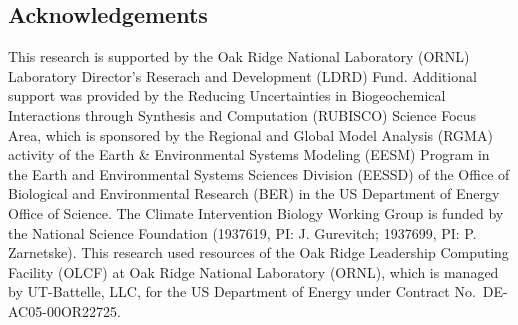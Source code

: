 \documentclass[landscape,custom]{sciposter}
\begin{document}
\begin{multicols}{3}
\section*{\large Acknowledgements}


\vspace*{-0.15in}
\vbox{%
This research is supported by the Oak Ridge National Laboratory (ORNL)
Laboratory Director's Reserach and Development (LDRD) Fund.
Additional support was provided by the Reducing Uncertainties in
Biogeochemical Interactions through Synthesis and Computation (RUBISCO)
Science Focus Area, which is sponsored by the Regional and Global Model
Analysis (RGMA) activity of the Earth \& Environmental Systems Modeling
(EESM) Program in the Earth and Environmental Systems Sciences Division
(EESSD) of the Office of Biological and Environmental Research (BER)
in the US Department of Energy Office of Science.
%
The Climate Intervention Biology Working Group is funded by the National
Science Foundation (1937619, PI: J. Gurevitch; 1937699, PI: P. Zarnetske).
%
This research used resources of the Oak Ridge Leadership Computing
Facility (OLCF) at Oak Ridge National Laboratory (ORNL), which is managed
by UT-Battelle, LLC, for the US Department of Energy under Contract
No.\ DE-AC05-00OR22725.
%
%
%
%
}


\end{multicols}
\end{document}
